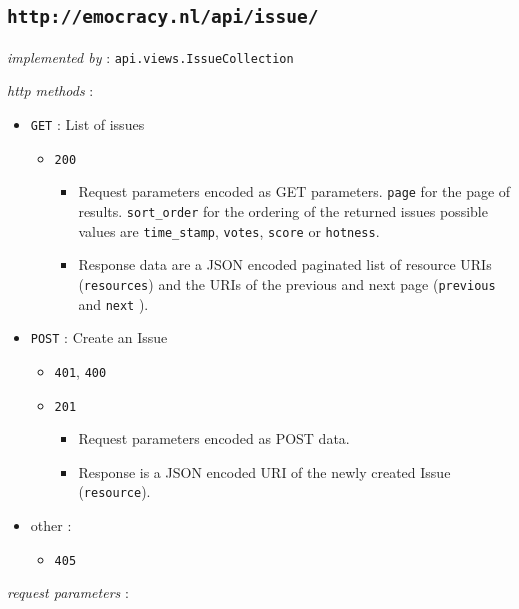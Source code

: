 \documentclass[a4paper]{report}
\begin{document}
\subsection{\texttt{http://emocracy.nl/api/issue/}}
\begin{itemize}
    \item{\textsl{implemented by} : \texttt{api.views.IssueCollection}}
    \item{\textsl{http methods} :
        \begin{itemize}
            \item{\texttt{GET} : List of issues 
                \begin{itemize}
                    \item{\texttt{200}
                    \begin{itemize}
                        \item{Request parameters encoded as GET parameters. 
                        \texttt{page} for the page of results. \texttt{sort\_order}
                        for the ordering of the returned issues possible values are
                        \texttt{time\_stamp}, \texttt{votes}, \texttt{score} or \texttt{hotness}.}
                        \item{Response data are a JSON encoded paginated list of 
                        resource URIs (\texttt{resources}) and the URIs of the 
                        previous and next page (\texttt{previous} and \texttt{next}
                        ).}
                    \end{itemize}
                    }
                \end{itemize}
             }
            \item{\texttt{POST} : Create an Issue
                \begin{itemize}
                    \item{\texttt{401}, \texttt{400}}
                    \item{\texttt{201}
                    \begin{itemize}
                        \item{Request parameters encoded as POST data.}
                        \item{Response is a JSON encoded URI of the newly
                        created Issue (\texttt{resource}).}
                    \end{itemize}
                    }
                \end{itemize}
            }
            \item{other : 
                \begin{itemize}
                    \item{\texttt{405}}
                \end{itemize}
            }
        \end{itemize}
    \item{\textsl{request parameters} : }
    }
\end{itemize}
\end{document}
